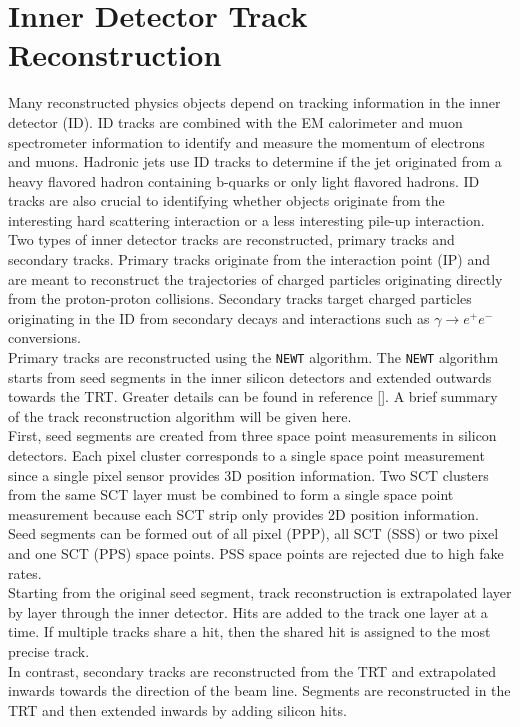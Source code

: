 \section{Inner Detector Track Reconstruction}
\label{sec:reco:IDtrack}

\indent  Many reconstructed physics objects depend on tracking information in the inner detector (ID).  ID tracks are combined with the EM calorimeter and muon spectrometer information to identify and measure the momentum of electrons and muons.  Hadronic jets use ID tracks to determine if the jet originated from a heavy flavored hadron containing b-quarks or only light flavored hadrons.  ID tracks are also crucial to identifying whether objects originate from the interesting hard scattering interaction or a less interesting pile-up interaction.\\

\indent Two types of inner detector tracks are reconstructed, primary tracks and secondary tracks.  Primary tracks originate from the interaction point (IP) and are meant to reconstruct the trajectories of charged particles originating directly from the proton-proton collisions.  Secondary tracks target charged particles originating in the ID from secondary decays and interactions such as $\gamma \rightarrow e^{+}e^{-}$ conversions.  \\

\indent Primary tracks are reconstructed using the {\tt NEWT} algorithm.  The {\tt NEWT} algorithm starts from seed segments in the inner silicon detectors and extended outwards towards the TRT. Greater details can be found in reference [\cite{NEWT}]. A brief summary of the track reconstruction algorithm will be given here.\\ 

\indent First, seed segments are created from three space point measurements in silicon detectors.  Each pixel cluster corresponds to a single space point measurement since a single pixel sensor provides 3D position information.  Two SCT clusters from the same SCT layer must be combined to form a single space point measurement because each SCT strip only provides 2D position information.  \\

\indent Seed segments can be formed out of all pixel (PPP), all SCT (SSS) or two pixel and one SCT (PPS) space points.  PSS space points are rejected due to high fake rates.  \\

\indent Starting from the original seed segment, track reconstruction is extrapolated layer by layer through the inner detector. Hits are added to the track one layer at a time.  If multiple tracks share a hit, then the shared hit is assigned to the most precise track.  \\%

\indent In contrast, secondary tracks are reconstructed from the TRT and extrapolated inwards towards the direction of the beam line.  Segments are reconstructed in the TRT and then extended inwards by adding silicon hits. \\
